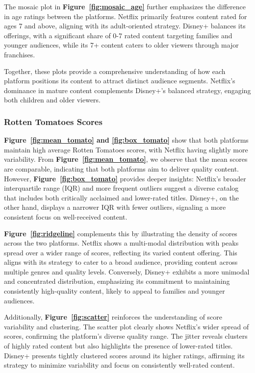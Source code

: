 \documentclass[a4paper, 12pt]{article}
\begin{document}
The mosaic plot in \textbf{Figure~\ref{fig:mosaic_age}} further emphasizes the difference in age ratings between the platforms. Netflix primarily features content rated for ages 7 and above, aligning with its adult-oriented strategy. Disney+ balances its offerings, with a significant share of 0-7 rated content targeting families and younger audiences, while its 7+ content caters to older viewers through major franchises.

Together, these plots provide a comprehensive understanding of how each platform positions its content to attract distinct audience segments. Netflix’s dominance in mature content complements Disney+’s balanced strategy, engaging both children and older viewers.

\subsubsection{Rotten Tomatoes Scores}


\textbf{Figure~\ref{fig:mean_tomato} and \ref{fig:box_tomato}} show that both platforms maintain high average Rotten Tomatoes scores, with Netflix having slightly more variability. From \textbf{Figure~\ref{fig:mean_tomato}}, we observe that the mean scores are comparable, indicating that both platforms aim to deliver quality content. However, \textbf{Figure~\ref{fig:box_tomato}} provides deeper insights: Netflix’s broader interquartile range (IQR) and more frequent outliers suggest a diverse catalog that includes both critically acclaimed and lower-rated titles. Disney+, on the other hand, displays a narrower IQR with fewer outliers, signaling a more consistent focus on well-received content.

\textbf{Figure~\ref{fig:ridgeline}} complements this by illustrating the density of scores across the two platforms. Netflix shows a multi-modal distribution with peaks spread over a wider range of scores, reflecting its varied content offering. This aligns with its strategy to cater to a broad audience, providing content across multiple genres and quality levels. Conversely, Disney+ exhibits a more unimodal and concentrated distribution, emphasizing its commitment to maintaining consistently high-quality content, likely to appeal to families and younger audiences.

Additionally, \textbf{Figure~\ref{fig:scatter}} reinforces the understanding of score variability and clustering. The scatter plot clearly shows Netflix’s wider spread of scores, confirming the platform’s diverse quality range. The jitter reveals clusters of highly rated content but also highlights the presence of lower-rated titles. Disney+ presents tightly clustered scores around its higher ratings, affirming its strategy to minimize variability and focus on consistently well-rated content.
\end{document}
